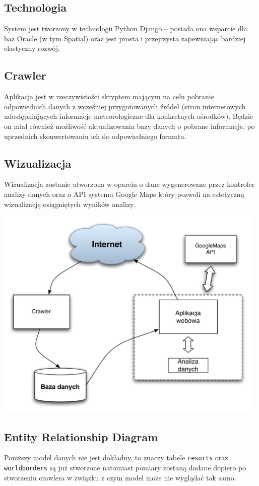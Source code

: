 \documentclass[12pt]{article}
\begin{document}
\subsection{Technologia}
System jest tworzony w technologii Python Django -- posiada ona wsparcie dla
baz Oracle (w tym Spatial) oraz jest prosta i przejrzysta zapewniając
bardziej elastyczny rozwój.

\subsection{Crawler}
Aplikacja jest w rzeczywistości skryptem mającym na celu pobranie
odpowiednich danych z wcześniej przygotowanych źródeł (stron internetowych
    udostępniających informacje meteorologiczne dla konkretnych ośrodków).
Będzie on miał również możliwość aktualizowania bazy danych o pobrane
informacje, po uprzednich skonwertowaniu ich do odpowiedniego formatu.

\subsection{Wizualizacja}
Wizualizacja zostanie utworzona w oparciu o dane wygenerowane przez kontroler
analizy danych oraz o API systemu Google Maps który pozwoli na estetyczną
wizualizację osiągniętych wyników analizy.

\includegraphics[width=35em]{images/data_flow_diagram.pdf}

\subsection{Entity Relationship Diagram}
Poniższy model danych nie jest dokładny, to znaczy tabele \texttt{resorts}
oraz \texttt{worldborders} są już stworzone natomiast pomiary zostaną dodane
dopiero po stworzeniu crawlera w związku z czym model może nie wyglądać tak samo.
\end{document}
